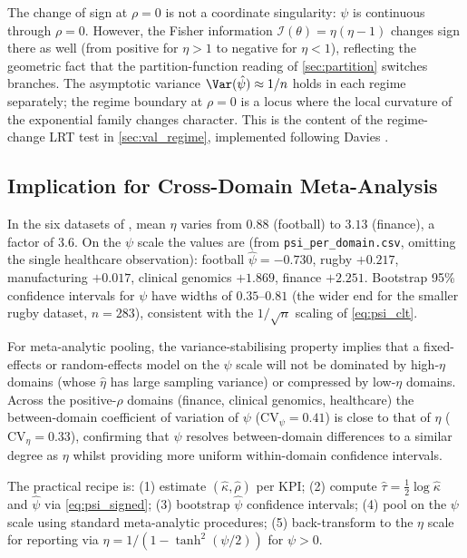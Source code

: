 The change of sign at $\rho = 0$ is not a coordinate singularity: $\psi$ is continuous through $\rho = 0$.  However, the Fisher information $\mathcal{I}(\theta) = \eta(\eta-1)$ changes sign there as well (from positive for $\eta > 1$ to negative for $\eta < 1$), reflecting the geometric fact that the partition-function reading of \cref{sec:partition} switches branches.  The asymptotic variance $\Var(\hat\psi) \approx 1/n$ holds in each regime separately; the regime boundary at $\rho = 0$ is a locus where the local curvature of the exponential family changes character.  This is the content of the regime-change LRT test in \cref{sec:val_regime}, implemented following Davies \parencite{davies1987}.

\subsection{Implication for Cross-Domain Meta-Analysis}
\label{sec:psi_meta}

In the six datasets of \textcite{brownPEFempirical}, mean $\eta$ varies from $0.88$ (football) to $3.13$ (finance), a factor of 3.6.  On the $\psi$ scale the values are (from \texttt{psi\_per\_domain.csv}, omitting the single healthcare observation): football $\hat\psi = -0.730$, rugby $+0.217$, manufacturing $+0.017$, clinical genomics $+1.869$, finance $+2.251$.  Bootstrap 95\% confidence intervals for $\psi$ have widths of $0.35$--$0.81$ (the wider end for the smaller rugby dataset, $n=283$), consistent with the $1/\sqrt{n}$ scaling of \cref{eq:psi_clt}.

For meta-analytic pooling, the variance-stabilising property implies that a fixed-effects or random-effects model on the $\psi$ scale \parencite{dersimonianLaird1986} will not be dominated by high-$\eta$ domains (whose $\hat\eta$ has large sampling variance) or compressed by low-$\eta$ domains.  Across the positive-$\rho$ domains (finance, clinical genomics, healthcare) the between-domain coefficient of variation of $\psi$ ($\mathrm{CV}_\psi = 0.41$) is close to that of $\eta$ ($\mathrm{CV}_\eta = 0.33$), confirming that $\psi$ resolves between-domain differences to a similar degree as $\eta$ whilst providing more uniform within-domain confidence intervals.

The practical recipe is: (1) estimate $(\hat\kappa, \hat\rho)$ per KPI; (2) compute $\hat\tau = \tfrac{1}{2}\log\hat\kappa$ and $\hat\psi$ via \cref{eq:psi_signed}; (3) bootstrap $\hat\psi$ confidence intervals; (4) pool on the $\psi$ scale using standard meta-analytic procedures; (5) back-transform to the $\eta$ scale for reporting via $\eta = 1/(1 - \tanh^{2}(\psi/2))$ for $\psi > 0$.

